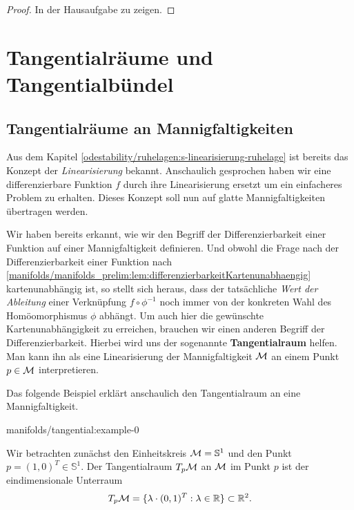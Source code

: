 \begin{proof}
 In der Hausaufgabe zu zeigen.
\end{proof}


\section{Tangentialräume und Tangentialbündel}
\label{\detokenize{manifolds/tangential:tangentialraume-und-tangentialbundel}}\label{\detokenize{manifolds/tangential::doc}}

\subsection{Tangentialräume an Mannigfaltigkeiten}
\label{\detokenize{manifolds/tangential:tangentialraume-an-mannigfaltigkeiten}}
\par
Aus dem Kapitel \cref{odestability/ruhelagen:s-linearisierung-ruhelage}  ist bereits das Konzept der \emph{Linearisierung} bekannt.
Anschaulich gesprochen haben wir eine differenzierbare Funktion \(f\) durch ihre Linearisierung ersetzt um ein einfacheres Problem zu erhalten.
Dieses Konzept soll nun auf glatte Mannigfaltigkeiten übertragen werden.

\par
Wir haben bereits erkannt, wie wir den Begriff der Differenzierbarkeit einer Funktion auf einer Mannigfaltigkeit definieren.
Und obwohl die Frage nach der Differenzierbarkeit einer Funktion nach \cref{manifolds/manifolds_prelim:lem:differenzierbarkeitKartenunabhaengig} kartenunabhängig ist, so stellt sich heraus, dass der tatsächliche \emph{Wert der Ableitung} einer Verknüpfung \(f \circ\phi^{-1}\) noch immer von der konkreten Wahl des Homöomorphismus \(\phi\) abhängt.
Um auch hier die gewünschte Kartenunabhängigkeit zu erreichen, brauchen wir einen anderen Begriff der Differenzierbarkeit.
Hierbei wird uns der sogenannte \textbf{Tangentialraum} helfen.
Man kann ihn als eine Linearisierung der Mannigfaltigkeit \(\mathcal{M}\) an einem Punkt \(p\in\mathcal{M}\) interpretieren.

\par
Das folgende Beispiel erklärt anschaulich den Tangentialraum an eine Mannigfaltigkeit.
\begin{example}{}{manifolds/tangential:example-0}



\par
Wir betrachten zunächst den Einheitskreis \(\mathcal{M} = \mathbb{S}^1\) und den Punkt \(p = (1, 0)^T \in \mathbb{S}^1\).
Der Tangentialraum \(T_p\mathcal{M}\) an \(\mathcal{M}\) im Punkt \(p\) ist der eindimensionale Unterraum
\begin{align*}
T_p\mathcal{M} = \lbrace \lambda \cdot (0, 1)^T : \lambda \in \mathbb{R} \rbrace \subset \mathbb{R}^2.
\end{align*}\end{example}

